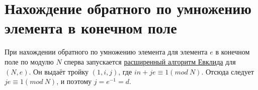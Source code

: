 \documentclass[12pt,a4paper]{scrartcl}
\begin{document}
	
\section{Нахождение обратного по умножению элемента в конечном поле}

При нахождении обратного по умножению элемента для элемента $e$ в конечном поле по модулю $N$ сперва запускается \href{https://yatb.kksctf.ru/}{расширенный алгоритм Евклида} для $(N, e)$. Он выдаёт тройку $(1, i, j)$, где $in+je\equiv 1 (mod\ N)$. Отсюда следует $je \equiv 1 (mod\ N)$, и поэтому $j=e^{-1}=d$. 
	
\end{document}
